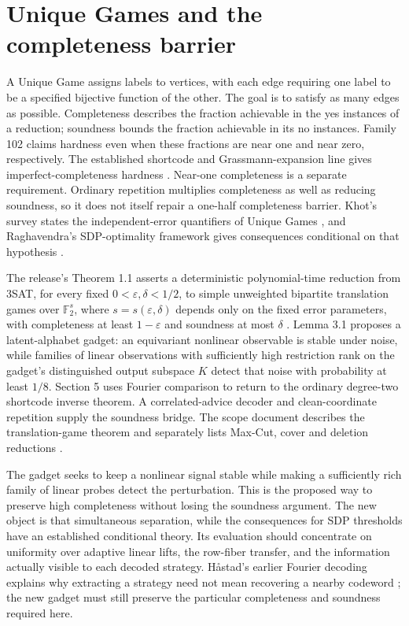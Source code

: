 \section{Unique Games and the completeness barrier}
\label{sec:frontier-unique-games}

A Unique Game assigns labels to vertices, with each edge requiring
one label to be a specified bijective function of the other. The goal
is to satisfy as many edges as possible. Completeness describes the
fraction achievable in the yes instances of a reduction; soundness
bounds the fraction achievable in its no instances. Family 102 claims
hardness even when these fractions are near one and near zero,
respectively. The established shortcode and Grassmann-expansion line gives
imperfect-completeness hardness \cite{FrontBKS2019,FrontKMS2023}. Near-one
completeness is a separate requirement. Ordinary repetition multiplies
completeness as well as reducing soundness, so it does not itself repair a
one-half completeness barrier. Khot's survey states the independent-error
quantifiers of Unique Games \cite{FrontKhot2010}, and Raghavendra's
SDP-optimality framework gives consequences conditional on that hypothesis
\cite{FrontRaghavendra2008}.

The release's Theorem 1.1 asserts a deterministic polynomial-time reduction
from 3SAT, for every fixed \(0<\varepsilon,\delta<1/2\), to simple unweighted
bipartite translation games over \(\mathbb F_2^s\), where
\(s=s(\varepsilon,\delta)\) depends only on the fixed error parameters,
with completeness
at least \(1-\varepsilon\) and soundness at most \(\delta\)
\cite{FrontOpenAIUGC}. Lemma 3.1 proposes a latent-alphabet gadget: an equivariant
nonlinear observable is stable under noise, while families of linear
observations with sufficiently high restriction rank on the gadget's
distinguished output subspace \(K\) detect that noise with probability at least
\(1/8\). Section 5 uses Fourier comparison to return to the ordinary
degree-two shortcode inverse theorem. A correlated-advice decoder and
clean-coordinate repetition supply the soundness bridge.
The scope document describes the translation-game theorem and separately
lists Max-Cut, cover and deletion reductions \cite{FrontScope102}.

The gadget seeks to keep a nonlinear signal stable while making a
sufficiently rich family of linear probes detect the perturbation.
This is the proposed way to preserve high completeness without losing
the soundness argument. The new object is that simultaneous separation,
while the consequences for SDP thresholds have an established conditional
theory. Its evaluation should concentrate on uniformity over adaptive
linear lifts, the row-fiber transfer, and the information actually visible to
each decoded strategy. H{\aa}stad's earlier Fourier decoding explains why
extracting a strategy need not mean recovering a nearby codeword
\cite{FrontHastad2001}; the new gadget must still preserve the particular
completeness and soundness required here.

